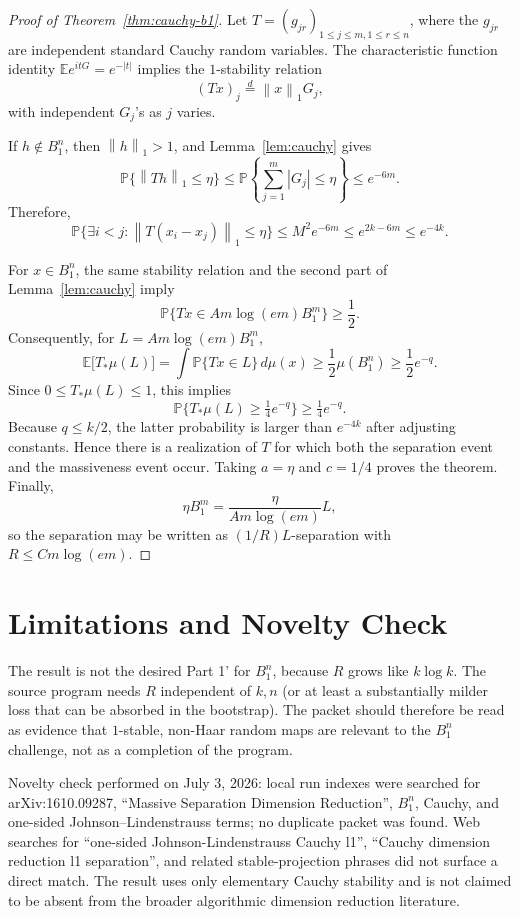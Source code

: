 \documentclass[11pt]{article}
\newcommand{\Pbb}{\mathbb P}
\newcommand{\E}{\mathbb E}
\newcommand{\norm}[1]{\left\lVert #1 \right\rVert}
\begin{document}
\begin{proof}[Proof of Theorem~\ref{thm:cauchy-b1}]
Let \(T=(g_{jr})_{1\le j\le m,1\le r\le n}\), where the \(g_{jr}\) are
independent standard Cauchy random variables.  The characteristic function
identity \(\E e^{itG}=e^{-|t|}\) implies the \(1\)-stability relation
\[
  (Tx)_j \stackrel{d}{=} \norm{x}_1 G_j ,
\]
with independent \(G_j\)'s as \(j\) varies.

If \(h\notin B_1^n\), then \(\norm{h}_1>1\), and Lemma~\ref{lem:cauchy} gives
\[
  \Pbb\{\norm{Th}_1\le \eta\}
  \le
  \Pbb\left\{\sum_{j=1}^m |G_j|\le \eta\right\}
  \le e^{-6m}.
\]
Therefore,
\[
  \Pbb\{\exists i<j:\norm{T(x_i-x_j)}_1\le \eta\}
  \le M^2 e^{-6m}\le e^{2k-6m}\le e^{-4k}.
\]

For \(x\in B_1^n\), the same stability relation and the second part of
Lemma~\ref{lem:cauchy} imply
\[
  \Pbb\{Tx\in A m\log(e m)B_1^m\}\ge \frac12 .
\]
Consequently, for \(L=A m\log(e m)B_1^m\),
\[
  \E\bigl[T_*\mu(L)\bigr]
  =\int \Pbb\{Tx\in L\}\,d\mu(x)
  \ge \frac12 \mu(B_1^n)
  \ge \frac12 e^{-q}.
\]
Since \(0\le T_*\mu(L)\le 1\), this implies
\[
  \Pbb\{T_*\mu(L)\ge \tfrac14 e^{-q}\}\ge \tfrac14 e^{-q}.
\]
Because \(q\le k/2\), the latter probability is larger than \(e^{-4k}\) after
adjusting constants.  Hence there is a realization of \(T\) for which both the
separation event and the massiveness event occur.  Taking \(a=\eta\) and
\(c=1/4\) proves the theorem.  Finally,
\[
  \eta B_1^m=\frac{\eta}{A m\log(e m)}L,
\]
so the separation may be written as \((1/R)L\)-separation with
\(R\le C m\log(e m)\).
\end{proof}

\section*{Limitations and Novelty Check}

The result is not the desired Part 1' for \(B_1^n\), because \(R\) grows like
\(k\log k\).  The source program needs \(R\) independent of \(k,n\) (or at
least a substantially milder loss that can be absorbed in the bootstrap).  The
packet should therefore be read as evidence that \(1\)-stable, non-Haar random
maps are relevant to the \(B_1^n\) challenge, not as a completion of the
program.

Novelty check performed on July 3, 2026: local run indexes were searched for
arXiv:1610.09287, ``Massive Separation Dimension Reduction'', \(B_1^n\), Cauchy,
and one-sided Johnson--Lindenstrauss terms; no duplicate packet was found.
Web searches for ``one-sided Johnson-Lindenstrauss Cauchy l1'', ``Cauchy
dimension reduction l1 separation'', and related stable-projection phrases did
not surface a direct match.  The result uses only elementary Cauchy stability
and is not claimed to be absent from the broader algorithmic dimension
reduction literature.
\end{document}
